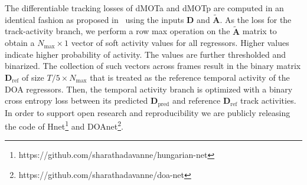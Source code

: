\documentclass[conference]{IEEEtran}
\def\D {\mathbf{D}}
\def\A {\mathbf{A}}
\def\tA {\tilde{\mathbf{A}}}
\begin{document}
The differentiable tracking losses of dMOTa and dMOTp are computed in an identical fashion as proposed in~\cite{xu2020train} using the inputs $\D$ and $\tA$. 
As the loss for the track-activity branch, we perform a row max operation on the $\tA$ matrix to obtain a $N_\mathrm{max} \times 1$ vector of soft activity values for all regressors. Higher values indicate higher probability of activity. The values are further thresholded and binarized. The collection of such vectors across frames result in the binary matrix $\mathbf{D}_\mathrm{ref}$ of size $T/5\times N_\mathrm{max}$ that is treated as the reference temporal activity of the DOA regressors. Then, the temporal activity branch is optimized with a binary cross entropy loss between its predicted $\mathbf{D}_\mathrm{pred}$ and reference $\mathbf{D}_\mathrm{ref}$ track activities.
In order to support open research and reproducibility we are publicly releasing the code of Hnet\footnote{https://github.com/sharathadavanne/hungarian-net} and DOAnet\footnote{https://github.com/sharathadavanne/doa-net}.
\end{document}
